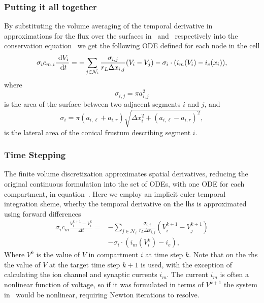 \subsubsection{Putting it all together}
By substituting the volume averaging of the temporal derivative in~ approximations for the flux over the surfaces in~ and~ respectively into the conservation equation~ we get the following ODE defined for each node in the cell
\begin{equation}
    \sigma_i c_{m,i} \frac{~\text{d}{V_i}}{~\text{d}{t}}
       = -\sum_{j\in\mathcal{N}_i} {\frac{\sigma_{i,j}}{r_L \Delta x_{i,j}} (V_i-V_j)} - \sigma_i\cdot(i_m(V_i) - i_e(x_i)),
    \label{eq:ode}
\end{equation}
where
\begin{equation}
    \sigma_{i,j} = \pi a_{i,j}^2
    \label{eq:sigma_ij}
\end{equation}
is the area of the surface between two adjacent segments $i$ and $j$, and
\begin{equation}
    \sigma_{i}   = \pi(a_{i,\ell} + a_{i,r}) \sqrt{\Delta x_i^2 + (a_{i,\ell} - a_{i,r})^2},
    \label{eq:sigma_i}
\end{equation}
is the lateral area of the conical frustum describing segment $i$.

\subsubsection{Time Stepping}
The finite volume discretization approximates spatial derivatives, reducing the original continuous formulation into the set of ODEs, with one ODE for each compartment, in equation~.
Here we employ an implicit euler temporal integration sheme, wherby the temporal derivative on the lhs is approximated using forward differences
\begin{align}
    \sigma_i c_m \frac{V_i^{k+1}-V_i^{k}}{\Delta t}
        = & -\sum_{j\in\mathcal{N}_i} {\frac{\sigma_{i,j}}{r_L \Delta x_{i,j}} (V_i^{k+1}-V_j^{k+1})} \nonumber \\
          & - \sigma_i\cdot(i_m(V_i^{k}) - i_e),
    \label{eq:ode_subs}
\end{align}
Where $V^k$ is the value of $V$ in compartment $i$ at time step $k$.
Note that on the rhs the value of $V$ at the target time step $k+1$ is used, with the exception of calculating the ion channel and synaptic currents $i_m$.
The current $i_m$ is often a nonlinear function of voltage, so if it was formulated in terms of $V^{k+1}$ the system in~ would be nonlinear, requiring Newton iterations to resolve.

